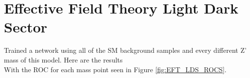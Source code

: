 \documentclass[12pt, a4paper]{book}
\begin{document}
\clearpage
\section{Effective Field Theory Light Dark Sector}
Trained a network using all of the SM background samples and every different Z' mass of this model. Here are the results
\\With the ROC for each mass point seen in Figure \ref{fig:EFT_LDS_ROCS}.
\end{document}
